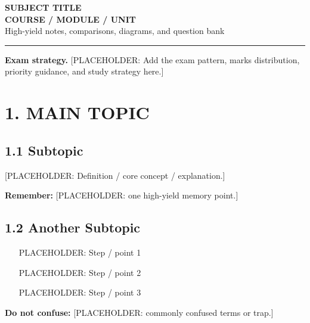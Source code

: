 \documentclass[11pt,a4paper]{article}
\begin{document}
\begin{center}
{\Huge\bfseries\color{navy} SUBJECT TITLE}\\[4pt]
{\LARGE\bfseries COURSE / MODULE / UNIT}\\[8pt]
{\large High-yield notes, comparisons, diagrams, and question bank}\\[10pt]
\rule{0.85\textwidth}{0.6pt}
\end{center}

\begin{exambox}
\textbf{Exam strategy.} [PLACEHOLDER: Add the exam pattern, marks distribution, priority guidance, and study strategy here.]
\end{exambox}

\tableofcontents

\newpage

\section{1. MAIN TOPIC}

\subsection{1.1 Subtopic}
[PLACEHOLDER: Definition / core concept / explanation.]

\begin{center}
\end{center}

\begin{rememberbox}
\textbf{Remember:} [PLACEHOLDER: one high-yield memory point.]
\end{rememberbox}

\subsection{1.2 Another Subtopic}
\begin{enumerate}
    \item [PLACEHOLDER: Step / point 1]
    \item [PLACEHOLDER: Step / point 2]
    \item [PLACEHOLDER: Step / point 3]
\end{enumerate}

\begin{dangerbox}
\textbf{Do not confuse:} [PLACEHOLDER: commonly confused terms or trap.]
\end{dangerbox}
\end{document}
